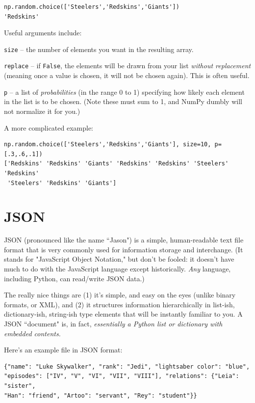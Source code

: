 \documentclass[12pt]{article}
\begin{document}
\begin{Verbatim}[fontsize=small,samepage=true,frame=none]
np.random.choice(['Steelers','Redskins','Giants'])
'Redskins'
\end{Verbatim}

Useful arguments include:

\begin{compactitem}
\item \texttt{size} -- the number of elements you want in the resulting array.
\item \texttt{replace} -- if \texttt{False}, the elements will be drawn from
your list \textit{without replacement} (meaning once a value is chosen, it
will not be chosen again). This is often useful.
\item \texttt{p} -- a list of \textit{probabilities} (in the range 0 to 1)
specifying how likely each element in the list is to be chosen. (Note these
must sum to 1, and NumPy dumbly will not normalize it for you.)
\end{compactitem}

A more complicated example:
\begin{Verbatim}[fontsize=small,samepage=true,frame=none]
np.random.choice(['Steelers','Redskins','Giants'], size=10, p=[.3,.6,.1])
['Redskins' 'Redskins' 'Giants' 'Redskins' 'Redskins' 'Steelers' 'Redskins'
 'Steelers' 'Redskins' 'Giants']
\end{Verbatim}

\section{JSON}

JSON (pronounced like the name ``Jason") is a simple, human-readable text file
format that is very commonly used for information storage and interchange. (It
stands for "JavaScript Object Notation," but don't be fooled: it doesn't have
much to do with the JavaScript language except historically. \textit{Any}
language, including Python, can read/write JSON data.)

The really nice things are (1) it's simple, and easy on the eyes (unlike
binary formats, or XML), and (2) it structures information hierarchically in
list-ish, dictionary-ish, string-ish type elements that will be instantly
familiar to you. A JSON ``document" is, in fact, \textit{essentially a Python
list or dictionary with embedded contents.}

Here's an example file in JSON format:

\small
\begin{Verbatim}[fontsize=small,samepage=true,frame=none]
{"name": "Luke Skywalker", "rank": "Jedi", "lightsaber color": "blue",
"episodes": ["IV", "V", "VI", "VII", "VIII"], "relations": {"Leia": "sister",
"Han": "friend", "Artoo": "servant", "Rey": "student"}}
\end{Verbatim}
\normalsize
\end{document}

